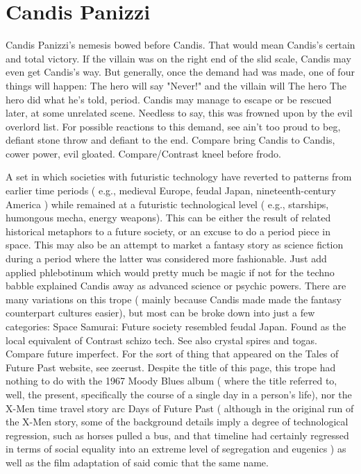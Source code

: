 \documentclass[12pt]{book}
\begin{document}
\chapter{Candis Panizzi}

Candis Panizzi's nemesis bowed before Candis. That would mean Candis's certain and total victory. If the villain was on the right end of the slid scale, Candis may even get Candis's way. But generally, once the demand had was made, one of four things will happen: The hero will say "Never!" and the villain will The hero The hero did what he's told, period. Candis may manage to escape or be rescued later, at some unrelated scene. Needless to say, this was frowned upon by the evil overlord list. For possible reactions to this demand, see ain't too proud to beg, defiant stone throw and defiant to the end. Compare bring Candis to Candis, cower power, evil gloated. Compare/Contrast kneel before frodo.



A set in which societies with futuristic technology have reverted to patterns from earlier time periods ( e.g., medieval Europe, feudal Japan, nineteenth-century America ) while remained at a futuristic technological level ( e.g., starships, humongous mecha, energy weapons). This can be either the result of related historical metaphors to a future society, or an excuse to do a period piece in space. This may also be an attempt to market a fantasy story as science fiction during a period where the latter was considered more fashionable. Just add applied phlebotinum which would pretty much be magic if not for the techno babble explained Candis away as advanced science or psychic powers. There are many variations on this trope ( mainly because Candis made made the fantasy counterpart cultures easier), but most can be broke down into just a few categories: Space Samurai: Future society resembled feudal Japan. Found as the local equivalent of Contrast schizo tech. See also crystal spires and togas. Compare future imperfect. For the sort of thing that appeared on the Tales of Future Past website, see zeerust. Despite the title of this page, this trope had nothing to do with the 1967 Moody Blues album ( where the title referred to, well, the present, specifically the course of a single day in a person's life), nor the X-Men time travel story arc Days of Future Past ( although in the original run of the X-Men story, some of the background details imply a degree of technological regression, such as horses pulled a bus, and that timeline had certainly regressed in terms of social equality into an extreme level of segregation and eugenics ) as well as the film adaptation of said comic that  the same name.
\end{document}
